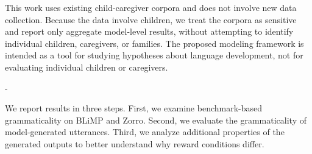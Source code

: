 This work uses existing child-caregiver corpora and does not involve new data collection. Because the data involve children, we treat the corpora as sensitive and report only aggregate model-level results, without attempting to identify individual children, caregivers, or families. The proposed modeling framework is intended as a tool for studying hypotheses about language development, not for evaluating individual children or caregivers.




-









\iffalse
We report results in three steps. First, we examine benchmark-based grammaticality on BLiMP and Zorro. Second, we evaluate the grammaticality of model-generated utterances. Third, we analyze additional properties of the generated outputs to better understand why reward conditions differ.


